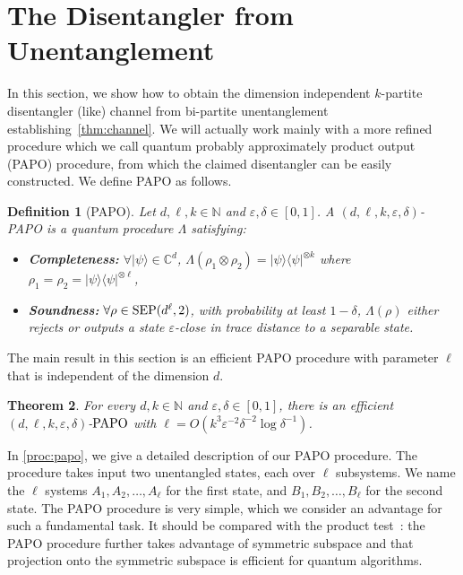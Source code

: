 \documentclass[10pt,a4paper]{article}
\newtheorem{theorem}{Theorem}[section]
\newtheorem{definition}[theorem]{Definition}
\theoremstyle{remark}
\def\epsilon{\varepsilon}
\newcommand{\C}{{\mathbb C}}
\newcommand{\N}{{\mathbb{N}}}
\newcommand{\1}[1]{\mathds{1}{[#1]}}
\newcommand{\ket}[1]{\lvert #1\rangle}
\newcommand{\SEP}{\textup{SEP}}
\newcommand{\papo}{\textup{PAPO}}
\newcommand{\bra}[1]{\langle#1|}
\numberwithin{equation}{section}
\begin{document}
\section{The Disentangler from Unentanglement}\label{sec:papo}

In this section, we show how to obtain the dimension independent $k$-partite disentangler (like) channel from bi-partite unentanglement establishing~\cref{thm:channel}.
We will actually work mainly with a more refined procedure which we call quantum probably approximately product output (PAPO) procedure, from which the claimed disentangler can be easily constructed. We define PAPO as follows.

\begin{definition}[PAPO]\label{def:papo}
Let $d, \ell, k \in \N$ and $\epsilon,\delta \in [0,1]$.
A $(d,\ell, k, \epsilon,\delta)$-\textup{PAPO} is a quantum procedure $\Lambda$ satisfying:
    \begin{itemize}[label={}]
        \item \textbf{\textup{Completeness:}} $\forall \ket{\psi} \in \C^d$, $\Lambda(\rho_1 \otimes \rho_2) = \ket{\psi}\bra{\psi}^{\otimes k}$ where $\rho_1=\rho_2=\ket{\psi}\bra{\psi}^{\otimes \ell}$,
        \item \textbf{\textup{Soundness:}} $\forall \rho \in \SEP(d^\ell,2)$, 
   with probability at least $1-\delta$, $\Lambda(\rho)$ either rejects or outputs a state $\epsilon$-close in trace distance to a separable state.
\end{itemize}
\end{definition}

The main result in this section is an efficient PAPO procedure with parameter $\ell$ that is independent of
the dimension $d$. 

\begin{theorem}\label{thm:papo}
  For every $d,k \in \N$ and $\epsilon, \delta \in [0,1]$, there is an efficient $(d,\ell,k,\epsilon,\delta)$-$\papo$
  with $\ell = O(k^3\epsilon^{-2}\delta^{-2}\log\delta^{-1})$.
\end{theorem}



In \cref{proc:papo}, we give a detailed description of our PAPO
procedure. The procedure takes input two unentangled states, each over $\ell$ subsystems. We name the $\ell$ systems $A_1, A_2, \ldots, A_\ell$ for the first state, and $B_1, B_2, \ldots, B_\ell$ for the second state. The PAPO procedure is very simple, which we consider an
advantage for such a fundamental task.  It should be compared with the product test~\cite{HM13}: the PAPO procedure further takes advantage of
symmetric subspace and that projection onto the symmetric subspace is
efficient for quantum algorithms. 
\end{document}
